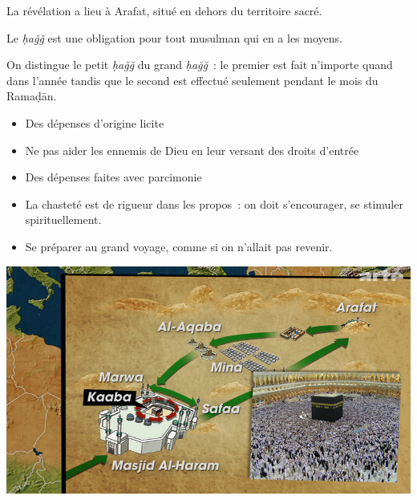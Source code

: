 La révélation a lieu à Arafat, situé en dehors du territoire sacré.

Le \emph{ḥaǧǧ} est une obligation pour tout musulman qui en a les
moyens.

On distingue le petit \emph{ḥağğ} du grand \emph{ḥağğ}~: le premier est
fait n'importe quand dans l'année tandis que le second est effectué
seulement pendant le mois du Ramaḍān.


\begin{itemize}
\item
  Des dépenses d'origine licite
\item
  Ne pas aider les ennemis de Dieu en leur versant des droits d'entrée
\item
  Des dépenses faites avec parcimonie
\item
  La chasteté est de rigueur dans les propos~: on doit s'encourager, se
  stimuler spirituellement.
\item
  Se préparer au grand voyage, comme si on n'allait pas revenir.
\end{itemize}


\includegraphics[width=\textwidth]{Images/image066.jpg}

